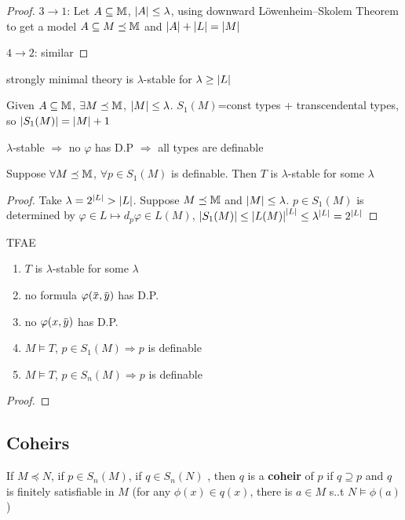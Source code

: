 \documentclass[11pt]{article}
\begin{document}
\begin{proof}
\(3\to 1\): Let \(A\subseteq\mathbb{M}\), \(\abs{A}\le\lambda\), using downward Löwenheim–Skolem Theorem to get a model
\(A\subseteq M\preceq\mathbb{M}\) and \(\abs{A}+\abs{L}=\abs{M}\)

\(4\to 2\): similar
\end{proof}


\begin{examplle}[]
strongly minimal theory is \(\lambda\)-stable for \(\lambda\ge\abs{L}\)

Given \(A\subseteq\mathbb{M}\), \(\exists M\preceq\mathbb{M}\), \(\abs{M}\le\lambda\). \(S_1(M)\)=const types + transcendental types, so \(\abs{S_1(M)}=\abs{M}+1\)
\end{examplle}

\(\lambda\)-stable \(\Rightarrow\) no \(\varphi\) has D.P \(\Rightarrow\) all types are definable

\begin{lemma}[]
Suppose \(\forall M\preceq\mathbb{M}\), \(\forall p\in S_1(M)\) is definable. Then \(T\) is \(\lambda\)-stable for some \(\lambda\)
\end{lemma}

\begin{proof}
Take \(\lambda=2^{\abs{L}}>\abs{L}\). Suppose \(M\preceq\mathbb{M}\)  and \(\abs{M}\le\lambda\). \(p\in S_1(M)\) is determined
by \(\varphi\in L\mapsto  d_p\varphi\in L(M)\), \(\abs{S_1(M)}\le\abs{L(M)}^{\abs{L}}\le\lambda^{\abs{L}}=2^{\abs{L}}\)
\end{proof}

\begin{theorem}[]
TFAE
\begin{enumerate}
\item \(T\) is \(\lambda\)-stable for some \(\lambda\)
\item no formula \(\varphi(\barx,\bary)\) has D.P.
\item no \(\varphi(x,\bary)\) has D.P.
\item \(M\vDash T\), \(p\in S_1(M)\Rightarrow p\) is definable
\item \(M\vDash T\), \(p\in S_n(M)\Rightarrow p\) is definable
\end{enumerate}
\end{theorem}

\begin{proof}

\end{proof}
\subsection{Coheirs}
\label{sec:org7c7f1ca}
\begin{definition}[]
If \(M\preceq N\), if \(p\in S_n(M)\), if \(q\in S_n(N)\) , then \(q\) is a \textbf{coheir} of \(p\)
if \(q\supseteq p\) and \(q\) is finitely satisfiable in \(M\) (for any \(\phi(x)\in q(x)\), there
is \(a\in M\) s..t \(N\vDash\phi(a)\))
\end{definition}
\end{document}
